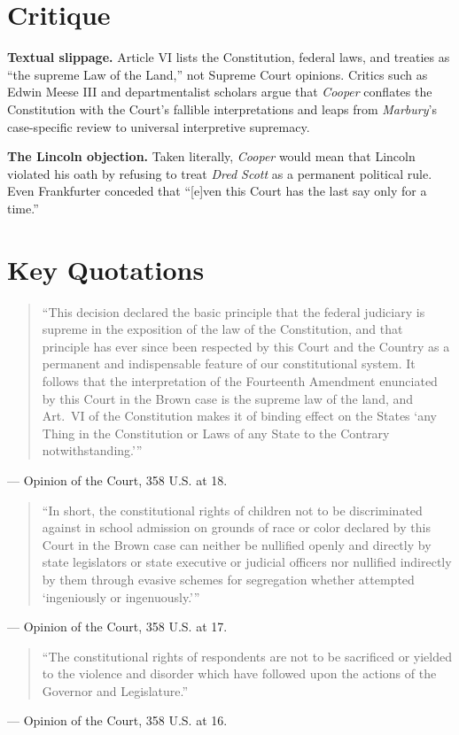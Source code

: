 \documentclass[12pt]{article}
\begin{document}
\section{Critique}

\textbf{Textual slippage.} Article VI lists the Constitution, federal laws, and treaties as ``the supreme Law of the Land,'' not Supreme Court opinions. Critics such as Edwin Meese III and departmentalist scholars argue that \textit{Cooper} conflates the Constitution with the Court's fallible interpretations and leaps from \textit{Marbury}'s case-specific review to universal interpretive supremacy.

\textbf{The Lincoln objection.} Taken literally, \textit{Cooper} would mean that Lincoln violated his oath by refusing to treat \textit{Dred Scott} as a permanent political rule. Even Frankfurter conceded that ``[e]ven this Court has the last say only for a time.''

\section{Key Quotations}

\begin{quote}
``This decision declared the basic principle that the federal judiciary is supreme in the exposition of the law of the Constitution, and that principle has ever since been respected by this Court and the Country as a permanent and indispensable feature of our constitutional system. It follows that the interpretation of the Fourteenth Amendment enunciated by this Court in the Brown case is the supreme law of the land, and Art.\ VI of the Constitution makes it of binding effect on the States `any Thing in the Constitution or Laws of any State to the Contrary notwithstanding.'\thinspace''
\end{quote}
\noindent --- Opinion of the Court, 358 U.S. at 18.

\begin{quote}
``In short, the constitutional rights of children not to be discriminated against in school admission on grounds of race or color declared by this Court in the Brown case can neither be nullified openly and directly by state legislators or state executive or judicial officers nor nullified indirectly by them through evasive schemes for segregation whether attempted `ingeniously or ingenuously.'\thinspace''
\end{quote}
\noindent --- Opinion of the Court, 358 U.S. at 17.

\begin{quote}
``The constitutional rights of respondents are not to be sacrificed or yielded to the violence and disorder which have followed upon the actions of the Governor and Legislature.''
\end{quote}
\noindent --- Opinion of the Court, 358 U.S. at 16.
\end{document}
